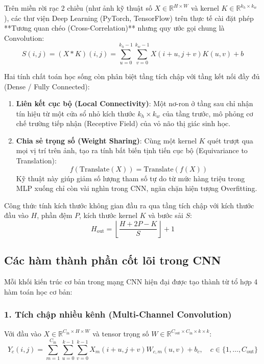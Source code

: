 \documentclass[12pt,a4paper]{article}
\begin{document}
Trên miền rời rạc 2 chiều (như ảnh kỹ thuật số $X \in \mathbb{R}^{H \times W}$ và kernel $K \in \mathbb{R}^{k_h \times k_w}$), các thư viện Deep Learning (PyTorch, TensorFlow) trên thực tế cài đặt phép **Tương quan chéo (Cross-Correlation)** nhưng quy ước gọi chung là Convolution:
\begin{equation}
    S(i, j) = (X * K)(i, j) = \sum_{u=0}^{k_h-1} \sum_{v=0}^{k_w-1} X(i+u, j+v) K(u, v) + b
    \label{eq:conv2d_math}
\end{equation}

Hai tính chất toán học sống còn phân biệt tầng tích chập với tầng kết nối đầy đủ (Dense / Fully Connected):
\begin{enumerate}[leftmargin=*]
    \item \textbf{Liên kết cục bộ (Local Connectivity)}: Một nơ-ron ở tầng sau chỉ nhận tín hiệu từ một cửa sổ nhỏ kích thước $k_h \times k_w$ của tầng trước, mô phỏng cơ chế trường tiếp nhận (Receptive Field) của vỏ não thị giác sinh học.
    \item \textbf{Chia sẻ trọng số (Weight Sharing)}: Cùng một kernel $K$ quét trượt qua mọi vị trí trên ảnh, tạo ra tính bất biến tịnh tiến cục bộ (Equivariance to Translation):
    \begin{equation}
        f(\text{Translate}(X)) = \text{Translate}(f(X))
    \end{equation}
    Kỹ thuật này giúp giảm số lượng tham số tự do từ mức hàng triệu trong MLP xuống chỉ còn vài nghìn trong CNN, ngăn chặn hiện tượng Overfitting.
\end{enumerate}

Công thức tính kích thước không gian đầu ra qua tầng tích chập với kích thước đầu vào $H$, phần đệm $P$, kích thước kernel $K$ và bước sải $S$:
\begin{equation}
    H_{\text{out}} = \left\lfloor \frac{H + 2P - K}{S} \right\rfloor + 1
\end{equation}

\subsection{Các hàm thành phần cốt lõi trong CNN}
Mỗi khối kiến trúc cơ bản trong mạng CNN hiện đại được tạo thành từ tổ hợp 4 hàm toán học cơ bản:

\subsubsection{1. Tích chập nhiều kênh (Multi-Channel Convolution)}
Với đầu vào $X \in \mathbb{R}^{C_{\text{in}} \times H \times W}$ và tensor trọng số $W \in \mathbb{R}^{C_{\text{out}} \times C_{\text{in}} \times k \times k}$:
\begin{equation}
    Y_c(i, j) = \sum_{m=1}^{C_{\text{in}}} \sum_{u=0}^{k-1} \sum_{v=0}^{k-1} X_m(i+u, j+v) W_{c, m}(u, v) + b_c, \quad c \in \{1, \dots, C_{\text{out}}\}
\end{equation}
\end{document}
